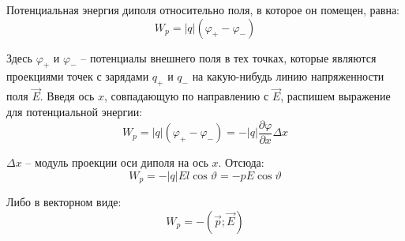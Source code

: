 \documentclass{article}
\begin{document}
	Потенциальная энергия диполя относительно поля, в которое он помещен, равна:
	\begin{equation}
		W_p = |q|(\varphi_+ - \varphi_-)
	\end{equation}

	Здесь $\varphi_+$ и $\varphi_-$ -- потенциалы внешнего поля в тех точках, которые являются проекциями точек с зарядами $q_+$ и $q_-$ на какую-нибудь линию напряженности поля $\vec E$. Введя ось $x$, совпадающую по направлению с $\vec E$, распишем выражение для потенциальной энергии:
	\begin{equation}
		W_p = |q|(\varphi_+ - \varphi_-) = -|q|\frac{\partial\varphi}{\partial x}\Delta x
	\end{equation}

	$\Delta x$ -- модуль проекции оси диполя на ось $x$. Отсюда:
	\begin{equation}
		W_p = -|q|El\cos\vartheta = -pE\cos\vartheta
	\end{equation}

	Либо в векторном виде:
	\begin{equation}
		W_p = -(\vec p;\vec E)
	\end{equation}
\end{document}
